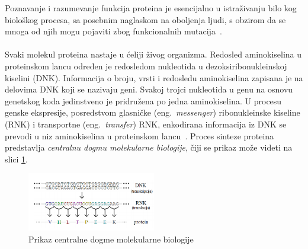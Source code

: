 Poznavanje i razumevanje funkcija proteina je esencijalno u istraživanju bilo kog biološkog procesa, sa posebnim naglaskom na oboljenja ljudi, s obzirom da
se mnoga od njih mogu pojaviti zbog funkcionalnih mutacija~\cite{JKd}.\\\\
Svaki molekul proteina nastaje u ćeliji živog organizma. Redosled aminokiselina u proteinskom lancu određen je redosledom nukleotida u dezoksiribonukleinskoj kiselini (DNK). Informacija o broju, vrsti i redosledu aminokiselina zapisana je na delovima DNK koji se nazivaju geni. Svakoj trojci nukleotida u genu na osnovu genetskog koda jedinstveno je pridružena po jedna aminokiselina. U procesu genske ekspresije, posredstvom glasničke
(eng.~{\em messenger}) ribonukleinske kiseline (RNK) i transportne (eng.~{\em transfer}) RNK, enkodirana informacija iz DNK se prevodi u niz aminokiselina u
proteinskom lancu~\cite{JKd}.
Proces sinteze proteina predstavlja \textit{centralnu dogmu molekularne biologije}, čiji se prikaz može videti na slici \ref{fig:dogma}.
\begin{figure}[h]
	\centering
    \includegraphics[width=0.5\textwidth]{Figures/BO/dogma.png}
    \caption{Prikaz centralne dogme molekularne biologije~\cite{JKd}}
    \label{fig:dogma}
\end{figure}

